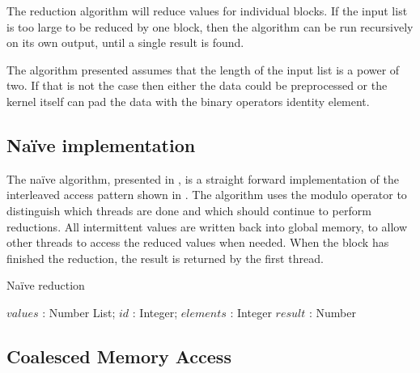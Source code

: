 
The reduction algorithm will reduce values for individual blocks. If the input
list is too large to be reduced by one block, then the algorithm can be run
recursively on its own output, until a single result is found.

The algorithm presented assumes that the length of the input list is a power of
two. If that is not the case then either the data could be preprocessed or the
kernel itself can pad the data with the binary operators identity element.

\subsection{Naïve implementation}

The naïve algorithm, presented in , is a
straight forward implementation of the interleaved access pattern
shown in . The algorithm uses the modulo operator
to distinguish which threads are done and which should continue to
perform reductions. All intermittent values are written back into
global memory, to allow other threads to access the reduced values
when needed. When the block has finished the reduction, the result
is returned by the first thread.

\begin{algorithm}
  \caption{Naïve reduction}
  \label{alg:naiveReduct}
  \begin{algorithmic}
              {$values$ : Number List; $id$ : Integer; $elements$ : Integer}
              {$result$ : Number}
              {
                  \ENDIF
                  \SYNC
                \ENDWHILE
                \ENDIF
              }
  \end{algorithmic}
\end{algorithm}

\subsection{Coalesced Memory Access}

